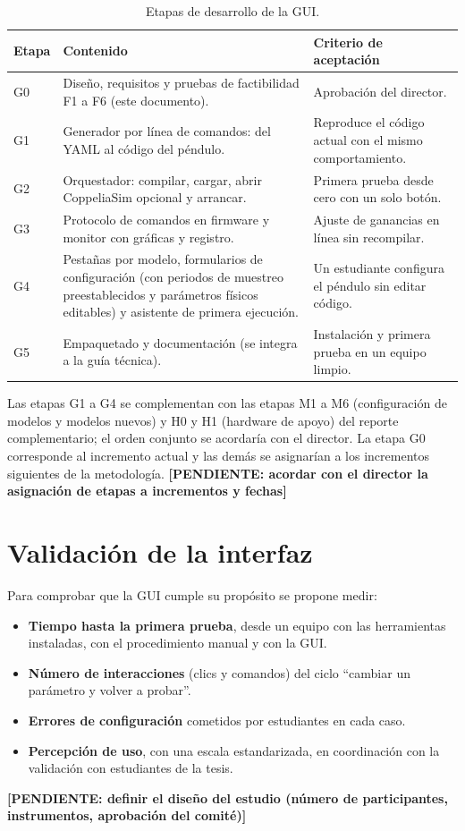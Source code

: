 \documentclass[12pt,letterpaper]{article}
\newcommand{\pendiente}[1]{\textbf{[PENDIENTE: #1]}}
\begin{document}
\begin{table}[!htbp]
\centering
\caption{Etapas de desarrollo de la GUI.}
\label{tab:etapas}
\begin{tabularx}{\textwidth}{>{\raggedright\arraybackslash}p{1.0cm}Y>{\raggedright\arraybackslash}p{4.5cm}}
\toprule
\textbf{Etapa} & \textbf{Contenido} & \textbf{Criterio de aceptación} \\
\midrule
G0 & Diseño, requisitos y pruebas de factibilidad F1 a F6 (este documento). & Aprobación del director. \\
G1 & Generador por línea de comandos: del YAML al código del péndulo. & Reproduce el código actual con el mismo comportamiento. \\
G2 & Orquestador: compilar, cargar, abrir CoppeliaSim opcional y arrancar. & Primera prueba desde cero con un solo botón. \\
G3 & Protocolo de comandos en firmware y monitor con gráficas y registro. & Ajuste de ganancias en línea sin recompilar. \\
G4 & Pestañas por modelo, formularios de configuración (con periodos de muestreo preestablecidos y parámetros físicos editables) y asistente de primera ejecución. & Un estudiante configura el péndulo sin editar código. \\
G5 & Empaquetado y documentación (se integra a la guía técnica). & Instalación y primera prueba en un equipo limpio. \\
\bottomrule
\end{tabularx}
\end{table}

Las etapas G1 a G4 se complementan con las etapas M1 a M6 (configuración de modelos y modelos nuevos) y H0 y H1 (hardware de apoyo) del reporte complementario; el orden conjunto se acordaría con el director. La etapa G0 corresponde al incremento actual y las demás se asignarían a los incrementos siguientes de la metodología. \pendiente{acordar con el director la asignación de etapas a incrementos y fechas}

\section{Validación de la interfaz}
\label{sec:validacion}

Para comprobar que la GUI cumple su propósito se propone medir:
\begin{itemize}
    \item \textbf{Tiempo hasta la primera prueba}, desde un equipo con las herramientas instaladas, con el procedimiento manual y con la GUI.
    \item \textbf{Número de interacciones} (clics y comandos) del ciclo ``cambiar un parámetro y volver a probar''.
    \item \textbf{Errores de configuración} cometidos por estudiantes en cada caso.
    \item \textbf{Percepción de uso}, con una escala estandarizada, en coordinación con la validación con estudiantes de la tesis.
\end{itemize}
\pendiente{definir el diseño del estudio (número de participantes, instrumentos, aprobación del comité)}
\end{document}
